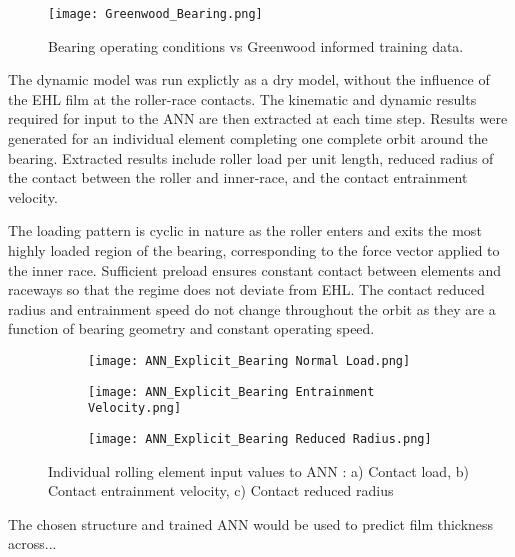 \begin{figure}
	\centering  
	\texttt{[image: Greenwood\_Bearing.png]}
	\caption{Bearing operating conditions vs Greenwood informed training data.}
	\label{Greenwood_Bearing}
\end{figure} 


The dynamic model was run explictly as a dry model, without the influence of the EHL film at the roller-race contacts. The kinematic and dynamic results required for input to the ANN are then extracted at each time step. Results were generated for an individual element completing one complete orbit around the bearing. Extracted results include roller load per unit length, reduced radius of the contact between the roller and inner-race, and the contact entrainment velocity.

The loading pattern is cyclic in nature as the roller enters and exits the most highly loaded region of the bearing, corresponding to the force vector applied to the inner race. Sufficient preload ensures constant contact between elements and raceways so that the regime does not deviate from EHL. The contact reduced radius and entrainment speed do not change throughout the orbit as they are a function of bearing geometry and constant operating speed.

\begin{figure}
	\centering
	\begin{subfigure}[b]{0.9\textwidth}
		\centering
		\texttt{[image: ANN\_Explicit\_Bearing Normal Load.png]}
		\caption{}
		\label{Contact Normal Load ANN}
	\end{subfigure}
	\hfill
	\begin{subfigure}[b]{0.9\textwidth}
		\centering
		\texttt{[image: ANN\_Explicit\_Bearing Entrainment Velocity.png]}
		\caption{}
		\label{Contact Entrainment ANN}
	\end{subfigure}
	\hfill
	\begin{subfigure}[b]{0.9\textwidth}
		\centering
		\texttt{[image: ANN\_Explicit\_Bearing Reduced Radius.png]}
		\caption{}
		\label{Contact Reduced Radius ANN}
	\end{subfigure}
	\caption{Individual rolling element input values to ANN : a) Contact load, b) Contact entrainment velocity, c) Contact reduced radius}
	\label{Individual rolling element input values to ANN}
\end{figure}

The chosen structure and trained ANN would be used to predict film thickness across...


